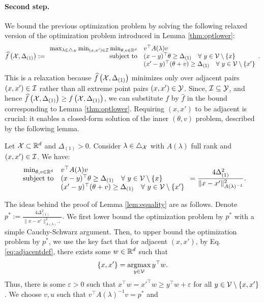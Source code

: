 \paragraph{Second step.}We bound the previous optimization problem by solving the following relaxed version of the optimization problem introduced in Lemma \ref{thm:optlower}:
\begin{equation}\label{eq:optimizationrelaxed}\widehat{f}\left(\mathcal{X}, \Delta_{(1)}\right) := \begin{array}{rl}
        \max_{\lambda\in\triangle_{\mathcal{X}}}\min_{(x, x')\in\mathcal{I}}\min_{\theta, v\in\mathbb{R}^d} & v^\top A(\lambda)v \\
        \mbox{\rm subject to} & (x - y)^\top\theta\geq \Delta_{(1)} \quad\forall~y \in \mathcal{V} \setminus \{x\}\\
    & (x' - y)^\top(\theta + v)\geq \Delta_{(1)}\quad\forall~ y \in \mathcal{V} \setminus \{x'\}
    \end{array}.\end{equation}
This is a relaxation because $\widehat{f}\left(\mathcal{X}, \Delta_{(1)}\right)$ minimizes only over adjacent pairs $(x, x')\in\mathcal{I}$ rather than all extreme point pairs $(x, x')\in\mathcal{Y}$. Since, $\mathcal{I} \subseteq \mathcal{Y}$, and hence $\widehat{f}\left(\mathcal{X}, \Delta_{(1)}\right) \geq f\left(\mathcal{X}, \Delta_{(1)}\right)$, we can substitute $f$ by $\widehat{f}$ in the bound corresponding to Lemma \ref{thm:optlower}. Requiring $(x,x')$ to be adjacent is crucial: it enables a closed-form solution of the inner $(\theta,v)$ problem, described by the following lemma.
\begin{lemma} \label{lem:equality}
Let $\mathcal{X} \subset \mathbb{R}^d$ and $\Delta_{(1)} > 0$. Consider $\lambda \in \triangle_{\mathcal{X}}$ with $A(\lambda)$ full rank and $(x,x') \in \mathcal{I}$. We have:
\begin{equation}\begin{array}{rl}
    \min_{\theta, v\in\mathbb{R}^d} & v^\top A(\lambda)v \\
   \mbox{\rm subject to}& (x - y)^\top\theta\geq \Delta_{(1)} \quad\forall~y \in \mathcal{V} \setminus \{x\}\\
    & (x' - y)^\top(\theta + v)\geq\Delta_{(1)}\quad\forall~ y \in \mathcal{V} \setminus \{x'\}
\end{array} = \frac{4\Delta_{(1)}^2}{\|x - x'\|^2_{A(\lambda)^{-1}}}.\end{equation}
\end{lemma}
The ideas behind the proof of Lemma \ref{lem:equality} are as follows. Denote $p^* :=\frac{4\Delta_{(1)}^2}{\|x - x'\|^2_{A(\lambda)^{-1}}}.$ We first lower bound the optimization problem by $p^*$ with a simple Cauchy-Schwarz argument. Then, to upper bound the optimization problem by $p^*$, we use the key fact that for adjacent $(x, x')$, by Eq. \eqref{eq:adjacentdef}, there exists some $w \in \mathbb{R}^d$ such that \begin{equation}
    \{x, x'\} = \operatorname*{argmax}_{y \in \mathcal{V}} y^\top w.
\end{equation} Thus, there is some $\varepsilon > 0$ such that $x^\top w = x'^\top w \geq y^\top w + \varepsilon$ for all $y \in \mathcal{V}\setminus \{x,x'\}$. We choose $v,u$ such that $v^\top A(\lambda)^{-1}v = p^*$ and
